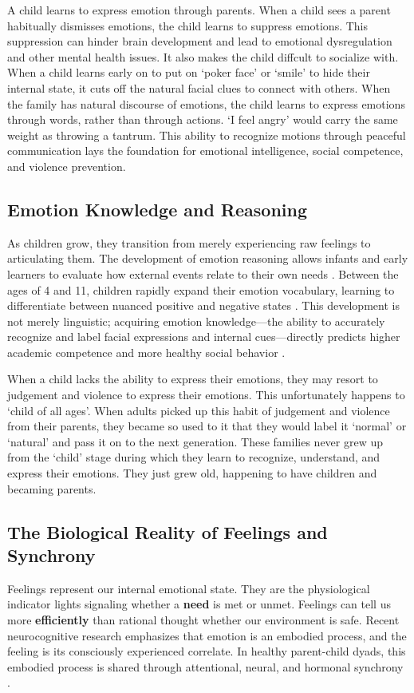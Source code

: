 A child learns to express emotion through parents.
When a child sees a parent habitually dismisses emotions, the child learns to suppress emotions.
This suppression can hinder brain development and lead to emotional dysregulation and other mental health issues.
It also makes the child diffcult to socialize with.
When a child learns early on to put on `poker face' or `smile' to hide their internal state, it cuts off the natural facial clues to connect with others.
When the family has natural discourse of emotions, the child learns to express emotions through words, rather than through actions.
`I feel angry' would carry the same weight as throwing a tantrum.
This ability to recognize motions through peaceful communication lays the foundation for emotional intelligence, social competence, and violence prevention.

\subsection{Emotion Knowledge and Reasoning}
As children grow, they transition from merely experiencing raw feelings to articulating them. 
The development of emotion reasoning allows infants and early learners to evaluate how external events relate to their own needs \citep{ruba2020}. 
Between the ages of 4 and 11, children rapidly expand their emotion vocabulary, learning to differentiate between nuanced positive and negative states \citep{streubel2021}. 
This development is not merely linguistic; acquiring emotion knowledge---the ability to accurately recognize and label facial expressions and internal cues---directly predicts higher academic competence and more healthy social behavior \citep{izard2001}.

When a child lacks the ability to express their emotions, they may resort to judgement and violence to express their emotions.
This unfortunately happens to `child of all ages'.
When adults picked up this habit of judgement and violence from their parents, they became so used to it that they would label it `normal' or `natural' and pass it on to the next generation.
These families never grew up from the `child' stage during which they learn to recognize, understand, and express their emotions.
They just grew old, happening to have children and becaming parents.

\subsection{The Biological Reality of Feelings and Synchrony}
Feelings represent our internal emotional state. 
They are the physiological indicator lights signaling whether a \textbf{need} is met or unmet. 
Feelings can tell us more \textbf{efficiently} than rational thought whether our environment is safe. 
Recent neurocognitive research emphasizes that emotion is an embodied process, and the feeling is its consciously experienced correlate. 
In healthy parent-child dyads, this embodied process is shared through attentional, neural, and hormonal synchrony \citep{christou2025}. 

